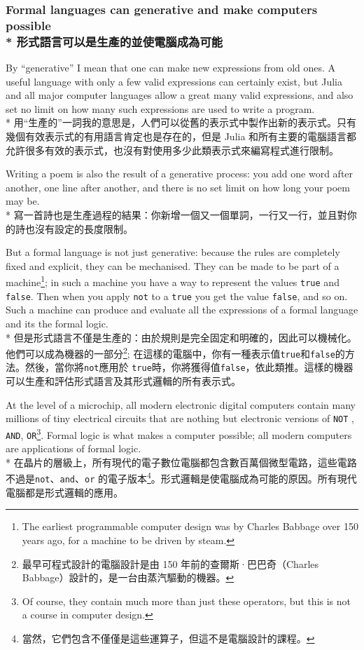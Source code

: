 \documentclass[]{article}
\begin{document}
\subsubsection*{{\color{gray}Formal languages can generative and make computers possible}
\\*
{形式語言可以是生產的並使電腦成為可能}}

{\color{gray}By ``generative'' I mean that one can make new expressions from old ones. A useful language with only a few valid expressions can certainly exist, but Julia and all major computer languages allow a great many valid expressions, and also set no limit on how many such expressions are used to write a program.}
\\*
{用``生產的''一詞我的意思是，人們可以從舊的表示式中製作出新的表示式。只有幾個有效表示式的有用語言肯定也是存在的，但是 Julia 和所有主要的電腦語言都允許很多有效的表示式，也沒有對使用多少此類表示式來編寫程式進行限制。}

{\color{gray}Writing a poem is also the result of a generative process: you add one word after another, one line after another, and there is no set limit on how long your poem may be.}
\\*
{寫一首詩也是生產過程的結果：你新增一個又一個單詞，一行又一行，並且對你的詩也沒有設定的長度限制。}

{\color{gray}But a formal language is not just generative: because the rules are  completely fixed and explicit, they can be mechanised. They can be made to be part of a machine\footnote{{\color{gray}The earliest programmable computer design was by Charles Babbage over 150 years ago, for a machine to be driven by steam.}}; in such a machine you have a way to represent the values {\tt true} and {\tt false}. Then when you apply {\tt not} to a {\tt true} you get the value {\tt false}, and so on. Such a machine can produce and evaluate all the expressions of a formal language and its the formal logic.}
\\*
{但是形式語言不僅是生產的：由於規則是完全固定和明確的，因此可以機械化。他們可以成為機器的一部分\footnote{最早可程式設計的電腦設計是由 150 年前的查爾斯·巴巴奇（Charles Babbage）設計的，是一台由蒸汽驅動的機器。}; 在這樣的電腦中，你有一種表示值{\tt true}和{\tt false}的方法。然後，當你將{\tt not}應用於 {\tt true}時，你將獲得值{\tt false}，依此類推。這樣的機器可以生產和評估形式語言及其形式邏輯的所有表示式。}

{\color{gray}At the level of a microchip, all modern electronic digital computers contain many millions of tiny electrical circuits that are nothing but electronic versions of {\tt NOT} , {\tt AND}, {\tt OR}\footnote{{\color{gray}Of course, they contain much more than just these operators, but this is not a course in computer design.}}. Formal logic is what makes a computer possible; all modern computers are applications of formal logic.
}
\\*
{在晶片的層級上，所有現代的電子數位電腦都包含數百萬個微型電路，這些電路不過是{\tt not}、{\tt and}、{\tt or} 的電子版本\footnote{當然，它們包含不僅僅是這些運算子，但這不是電腦設計的課程。}。形式邏輯是使電腦成為可能的原因。所有現代電腦都是形式邏輯的應用。}
\end{document}

